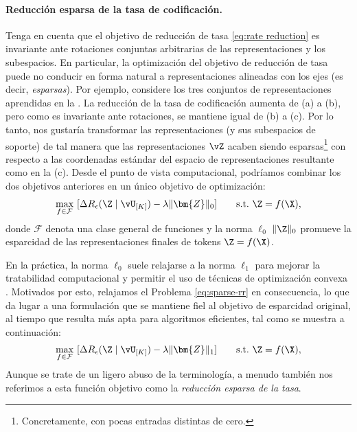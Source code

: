 \documentclass[../../book-main.tex]{subfiles}
\begin{document}
\paragraph{Reducción esparsa de la tasa de codificación.} Tenga en cuenta que el objetivo de reducción de tasa
\eqref{eq:rate reduction} es invariante ante rotaciones conjuntas arbitrarias
de las representaciones y los subespacios. En particular,
la optimización del objetivo de reducción de tasa puede no conducir en forma natural a
representaciones alineadas con los ejes (es decir, \textit{esparsas}). {Por ejemplo,
    considere los tres conjuntos de representaciones aprendidas en la
    . La reducción de la tasa de codificación aumenta
de (a) a (b), pero como es invariante ante rotaciones, se mantiene igual
de (b) a (c).} Por lo tanto, nos gustaría transformar las representaciones (y sus subespacios
de soporte) de tal manera que las representaciones $\vZ$ acaben siendo
esparsas\footnote{Concretamente, con pocas entradas distintas de cero.} con respecto
a las coordenadas estándar del espacio de representaciones resultante {como
en la (c)}. 
Desde el punto de vista computacional, podríamos combinar los dos objetivos anteriores en un único
objetivo de optimización:
\begin{equation}
    \max_{f \in \mathcal{F}}\ [\Delta R_{\epsilon}(\Z \mid \vU_{[K]})
    - \lambda \|\bm{Z}\|_0] \qquad \text{s.t.}\ \Z = f(\X),
    \label{eq:sparse-rr}
\end{equation}
donde $\mathcal{F}$ denota una clase general de funciones y la norma $\ell_0$
$\|\Z\|_0$ promueve la esparcidad de las representaciones finales de tokens
\(\Z = f(\X)\).%

En la práctica, la norma $\ell_0$ suele relajarse a la norma $\ell_1$
para mejorar la tratabilidad computacional y permitir el uso de técnicas
de optimización convexa \cite{Wright-Ma-2022}. Motivados por esto, relajamos el Problema
\eqref{eq:sparse-rr} en consecuencia, lo que da lugar a una formulación que
se mantiene fiel al objetivo de esparcidad original, al tiempo que resulta más
apta para algoritmos eficientes, tal como se muestra a continuación:
\begin{equation}
    \begin{aligned}
        \max_{f \in \mathcal{F}}\ [\Delta R_{\epsilon}(\Z \mid
        \vU_{[K]}) - \lambda \|\bm{Z}\|_1]  \qquad \text{s.t.}\ \Z = f(\X),
        \label{eq:sparse-rr-1}
    \end{aligned}
\end{equation}
Aunque se trate de un ligero abuso de la terminología, a menudo también nos referimos a esta función objetivo
como la \textit{reducción esparsa de la tasa}.
\end{document}
